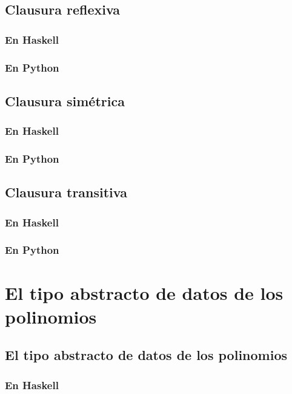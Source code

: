 \documentclass[a4paper,12pt,twoside]{book}
\begin{document}
\section{Clausura reflexiva}
\subsection{En Haskell}
\subsection{En Python}

\section{Clausura simétrica}
\subsection{En Haskell}
\subsection{En Python}

\section{Clausura transitiva}
\subsection{En Haskell}
\subsection{En Python}

\chapter{El tipo abstracto de datos de los polinomios}

\minitoc

\section{El tipo abstracto de datos de los polinomios}
\subsection{En Haskell}
\end{document}
